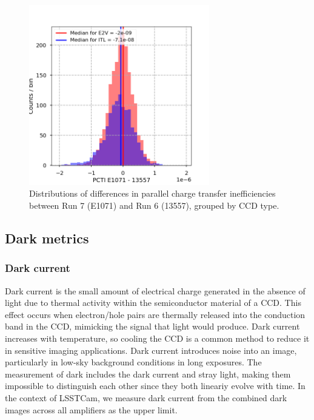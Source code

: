 \begin{figure}[H]
\begin{centering}
\includegraphics[width=0.7\textwidth]{figures/baselineCharacterization/PCTI_13557_E1071_diff.png}
\caption{Distributions of differences in parallel charge transfer inefficiencies between Run 7 (E1071) and Run 6 (13557), grouped by CCD type.}
\label{fig:parallel-cti-dist}
\end{centering}
\end{figure}

\subsection{Dark metrics}\label{dark-metrics}

\subsubsection{Dark current}\label{dark-current}

Dark current is the small amount of electrical charge generated in the
absence of light due to thermal activity within the semiconductor
material of a CCD. This effect occurs when electron/hole pairs are thermally released
into the conduction band in the CCD, mimicking the signal that light would
produce. Dark current increases with temperature, so cooling the CCD is
a common method to reduce it in sensitive imaging applications. Dark
current introduces noise into an image,
particularly in low-sky background conditions in long exposures.
The measurement of dark includes the dark current and stray light, making them impossible to distinguish each other since they both lineariy evolve with time.
In the context
of LSSTCam, we measure dark current from the combined dark images across
all amplifiers as the upper limit.

